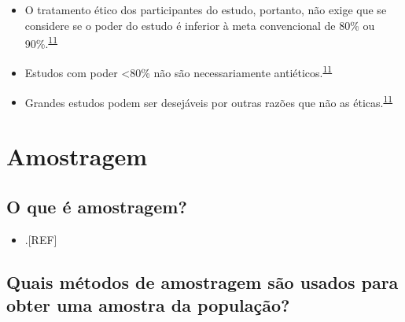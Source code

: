 \documentclass[
  a4paper,
]{book}
\providecommand{\tightlist}{%
  \setlength{\itemsep}{0pt}\setlength{\parskip}{0pt}}
\begin{document}
\begin{itemize}
\item
  O tratamento ético dos participantes do estudo, portanto, não exige que se considere se o poder do estudo é inferior à meta convencional de 80\% ou 90\%.\textsuperscript{\protect\hyperlink{ref-Bacchetti2005}{11}}
\item
  Estudos com poder \textless80\% não são necessariamente antiéticos.\textsuperscript{\protect\hyperlink{ref-Bacchetti2005}{11}}
\item
  Grandes estudos podem ser desejáveis por outras razões que não as éticas.\textsuperscript{\protect\hyperlink{ref-Bacchetti2005}{11}}
\end{itemize}

\hypertarget{amostragem}{%
\section{Amostragem}\label{amostragem}}

\hypertarget{o-que-uxe9-amostragem}{%
\subsection{O que é amostragem?}\label{o-que-uxe9-amostragem}}

\begin{itemize}
\tightlist
\item
  .{[}REF{]}
\end{itemize}

\hypertarget{quais-muxe9todos-de-amostragem-suxe3o-usados-para-obter-uma-amostra-da-populauxe7uxe3o}{%
\subsection{Quais métodos de amostragem são usados para obter uma amostra da população?}\label{quais-muxe9todos-de-amostragem-suxe3o-usados-para-obter-uma-amostra-da-populauxe7uxe3o}}
\end{document}
